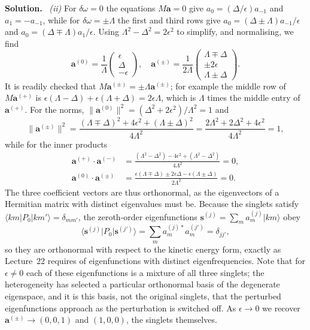 \documentclass[a4paper,12pt]{paper}
\newcounter{example}
\newenvironment{solution}{\par\noindent\textbf{Solution.}\ }{\par\medskip}
\begin{document}
\begin{solution}
\medskip
\noindent\textit{(ii)} For $\delta\omega=0$ the equations $M\mathbf{a}=0$ give
$a_{0}=(\Delta/\epsilon)a_{-1}$ and $a_{1}=-a_{-1}$, while for $\delta\omega=\pm\Lambda$ the
first and third rows give $a_{0}=(\Delta\pm\Lambda)a_{-1}/\epsilon$ and
$a_{0}=(\Delta\mp\Lambda)a_{1}/\epsilon$. Using $\Lambda^{2}-\Delta^{2}=2\epsilon^{2}$ to
simplify, and normalising, we find
\begin{equation}
\mathbf{a}^{(0)}=\frac{1}{\Lambda}\begin{pmatrix}\epsilon\\ \Delta\\ -\epsilon\end{pmatrix},\quad
\mathbf{a}^{(\pm)}=\frac{1}{2\Lambda}\begin{pmatrix}\Lambda\mp\Delta\\ \pm2\epsilon\\ \Lambda\pm\Delta\end{pmatrix}.
\label{eq:17}
\end{equation}
It is readily checked that $M\mathbf{a}^{(\pm)}=\pm\Lambda\mathbf{a}^{(\pm)}$; for example the
middle row of $M\mathbf{a}^{(+)}$ is $\epsilon(\Lambda-\Delta)+\epsilon(\Lambda+\Delta)=2\epsilon\Lambda$,
which is $\Lambda$ times the middle entry of $\mathbf{a}^{(+)}$. For the norms,
$\|\mathbf{a}^{(0)}\|^{2}=(\Delta^{2}+2\epsilon^{2})/\Lambda^{2}=1$ and
\begin{equation}
\|\mathbf{a}^{(\pm)}\|^{2}=\frac{(\Lambda\mp\Delta)^{2}+4\epsilon^{2}+(\Lambda\pm\Delta)^{2}}{4\Lambda^{2}}
=\frac{2\Lambda^{2}+2\Delta^{2}+4\epsilon^{2}}{4\Lambda^{2}}=1,
\label{eq:18}
\end{equation}
while for the inner products
\begin{align}
\mathbf{a}^{(+)}\cdot\mathbf{a}^{(-)}&=\frac{(\Lambda^{2}-\Delta^{2})-4\epsilon^{2}+(\Lambda^{2}-\Delta^{2})}{4\Lambda^{2}}=0,\nonumber\\
\mathbf{a}^{(0)}\cdot\mathbf{a}^{(\pm)}&=\frac{\epsilon(\Lambda\mp\Delta)\pm2\epsilon\Delta-\epsilon(\Lambda\pm\Delta)}{2\Lambda^{2}}=0 .
\label{eq:19}
\end{align}
The three coefficient vectors are thus orthonormal, as the eigenvectors of a Hermitian matrix
with distinct eigenvalues must be. Because the singlets satisfy
$\langle km|P_{0}|km'\rangle=\delta_{mm'}$, the zeroth-order eigenfunctions
$\mathbf{s}^{(j)}=\sum_{m}a^{(j)}_{m}|km\rangle$ obey
\begin{equation}
\langle\mathbf{s}^{(j)}|P_{0}|\mathbf{s}^{(j')}\rangle=\sum_{m}a_{m}^{(j)*}a_{m}^{(j')}=\delta_{jj'},
\label{eq:20}
\end{equation}
so they are orthonormal with respect to the kinetic energy form, exactly as Lecture~22
requires of eigenfunctions with distinct eigenfrequencies. Note that for $\epsilon\ne0$ each
of these eigenfunctions is a mixture of all three singlets; the heterogeneity has selected a
particular orthonormal basis of the degenerate eigenspace, and it is this basis, not the
original singlets, that the perturbed eigenfunctions approach as the perturbation is
switched off. As $\epsilon\to0$ we recover $\mathbf{a}^{(\pm)}\to(0,0,1)$ and $(1,0,0)$, the
singlets themselves.


\end{solution}
\end{document}
